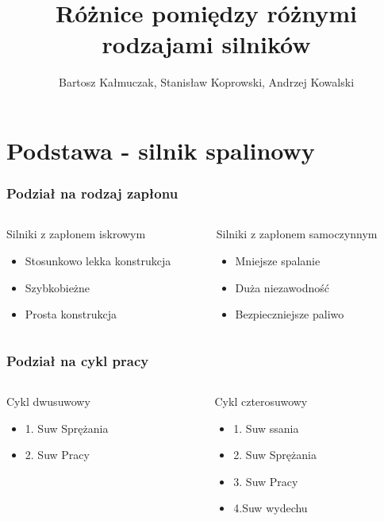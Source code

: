 \documentclass{beamer}
\title{Różnice pomiędzy różnymi rodzajami silników}
\author{Bartosz Kałmuczak, Stanisław Koprowski, Andrzej Kowalski}
\institute{Politechnika Poznańska}
\begin{document}
	\begin{frame} 
		\titlepage
	\end{frame}

\section{Podstawa - silnik spalinowy}

	\begin{frame} 
	\frametitle{Podział na rodzaj zapłonu}

		\begin{columns}

			\begin{column}{0.5\textwidth}
			\pause Silniki z zapłonem iskrowym

				\begin{itemize}
				\pause \item Stosunkowo lekka konstrukcja
				\pause \item Szybkobieżne
				\pause \item Prosta konstrukcja
				\end{itemize}

			\end{column}

			\begin{column}{0.5\textwidth}
			\pause Silniki z zapłonem samoczynnym

				\begin{itemize}
				\pause \item Mniejsze spalanie
				\pause \item Duża niezawodność
				\pause \item Bezpieczniejsze paliwo
				\end{itemize}
			\end{column}
		\end{columns}



	\end{frame}
	\begin{frame}

	\frametitle{Podział na cykl pracy}
		\begin{columns} 
			\begin{column}{0.5\textwidth}
				\pause \Large Cykl dwusuwowy
				\begin{itemize}
					\small \pause \item 1. Suw Sprężania
					\item \small 2. Suw Pracy
				\end{itemize}
			\end{column}

			\begin{column}{0.5\textwidth}
			\pause \Large Cykl czterosuwowy
				\begin{itemize}
				\small \pause \item 1. Suw ssania
				\item \small 2. Suw Sprężania
				\item \small 3. Suw Pracy
				\item \small 4.Suw wydechu
				\end{itemize}
			\end{column}
		\end{columns}
 	\end{frame}
\end{document}
